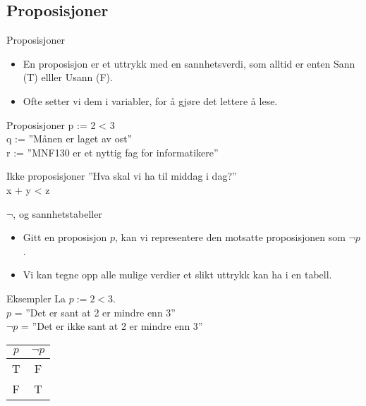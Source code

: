 \subsection{Proposisjoner}
\begin{frame}{Proposisjoner}
\begin{itemize}
    \item En proposisjon er et uttrykk med en sannhetsverdi, som alltid er enten Sann (T) elller Usann (F).
    \item Ofte setter vi dem i variabler, for å gjøre det lettere å lese.
\end{itemize}
\pause
\begin{block}{Proposisjoner}
    p := 2 < 3 \\
    q := ''Månen er laget av ost''\\
    r := ''MNF130 er et nyttig fag for informatikere''
\end{block}
\pause
\begin{block}{Ikke proposisjoner}
    ''Hva skal vi ha til middag i dag?''\\
    x + y < z
\end{block}
\end{frame}

\begin{frame}{$\lnot$, og sannhetstabeller}
\begin{itemize}
    \item Gitt en proposisjon $p$, kan vi representere den motsatte proposisjonen som $\lnot p$.
    \item Vi kan tegne opp alle mulige verdier et slikt uttrykk kan ha i en tabell.
\end{itemize}
\pause

\begin{block}{Eksempler}
    La $p := 2 < 3$. \\
    $p$ = ''Det er sant at 2 er mindre enn 3'' \\
    $\lnot p$ = ''Det er ikke sant at 2 er mindre enn 3''
\end{block}
\pause
\begin{tabular}{c|c}
$p$ & $\lnot p$ \\ \hline
T & F \\
F & T \\ \hline
\end{tabular}
\end{frame}

